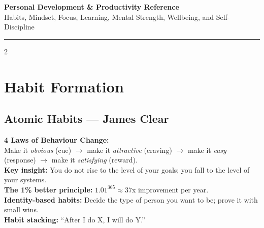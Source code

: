 \documentclass[10pt,a4paper]{article}
\begin{document}
\begin{center}
{\LARGE\bfseries\color{accent} Personal Development \& Productivity Reference}\\[4pt]
{\small Habits, Mindset, Focus, Learning, Mental Strength, Wellbeing, and Self-Discipline}
\end{center}
\vspace{4pt}\hrule\vspace{6pt}

\begin{multicols}{2}

\section{Habit Formation}

\subsection{Atomic Habits --- James Clear}
\textbf{4 Laws of Behaviour Change:}\\
Make it \textit{obvious} (cue) $\to$ make it \textit{attractive} (craving) $\to$ make it \textit{easy} (response) $\to$ make it \textit{satisfying} (reward).\\
\textbf{Key insight:} You do not rise to the level of your goals; you fall to the level of your systems.\\
\textbf{The 1\% better principle:} $1.01^{365} \approx 37$x improvement per year.\\
\textbf{Identity-based habits:} Decide the type of person you want to be; prove it with small wins.\\
\textbf{Habit stacking:} ``After I do X, I will do Y.''


\end{multicols}
\end{document}
